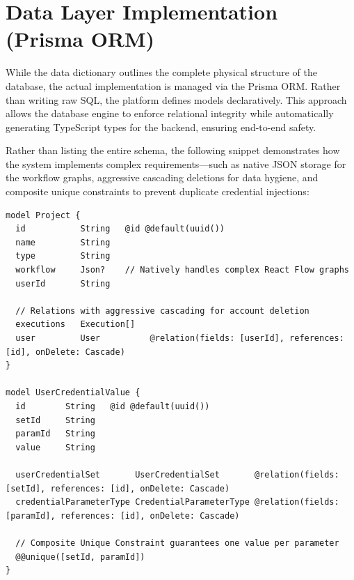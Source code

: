\section{Data Layer Implementation (Prisma ORM)}

While the data dictionary outlines the complete physical structure of the database, the actual implementation is managed via the Prisma ORM. Rather than writing raw SQL, the platform defines models declaratively. This approach allows the database engine to enforce relational integrity while automatically generating TypeScript types for the backend, ensuring end-to-end safety.

Rather than listing the entire schema, the following snippet demonstrates how the system implements complex requirements—such as native JSON storage for the workflow graphs, aggressive cascading deletions for data hygiene, and composite unique constraints to prevent duplicate credential injections:

\begin{lstlisting}[caption={Prisma implementation highlighting JSON types, relations, and composite constraints}]
model Project {
  id           String   @id @default(uuid())
  name         String
  type         String
  workflow     Json?    // Natively handles complex React Flow graphs
  userId       String

  // Relations with aggressive cascading for account deletion
  executions   Execution[]
  user         User          @relation(fields: [userId], references: [id], onDelete: Cascade)
}

model UserCredentialValue {
  id        String   @id @default(uuid())
  setId     String
  paramId   String
  value     String

  userCredentialSet       UserCredentialSet       @relation(fields: [setId], references: [id], onDelete: Cascade)
  credentialParameterType CredentialParameterType @relation(fields: [paramId], references: [id], onDelete: Cascade)

  // Composite Unique Constraint guarantees one value per parameter
  @@unique([setId, paramId])
}
\end{lstlisting}